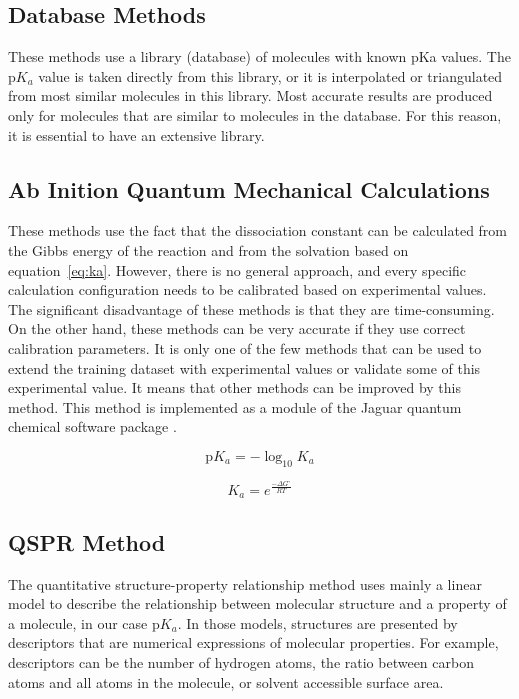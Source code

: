 \subsection{Database Methods}

These methods \cite{Sayle, Blower2006} use a library (database) of molecules
with known pKa values. The p$K_a$ value is taken directly from this library, or 
it is interpolated or triangulated from most similar molecules in this library.
Most accurate results are produced only for molecules that are similar to
molecules in the database. For this reason, it is essential to have
an extensive library.

\subsection{Ab Inition Quantum Mechanical Calculations}

These methods \cite{Liptak2002, Toth2001} use the fact that the dissociation 
constant can be calculated from the Gibbs energy of the reaction and from the
solvation based on equation~\ref{eq:ka}. However, there is no general approach,
and every specific calculation configuration needs to be calibrated based on
experimental values. The significant disadvantage of these methods is that they
are time-consuming. On the other hand, these methods can be very accurate if
they use correct calibration parameters. It is only one of the few methods that
can be used to extend the training dataset with experimental values or validate
some of this experimental value. It means that other methods can be improved
by this method. This method is implemented as a module of the Jaguar quantum
chemical software package \cite{jaguar}.

\begin{equation}
    \mathrm{p}K_a = - \log_{10} K_a
\end{equation}

\begin{equation} \label{eq:ka}
    K_a = e^{\frac{-\Delta G^\circ}{RT}}
\end{equation}

\subsection{QSPR Method}

The quantitative structure-property relationship method \cite{Dixon1993,
Zhang2006, Jelfs2007} uses mainly
a linear model to describe the relationship between molecular structure and
a property of a molecule, in our case p$K_a$. In those models, structures are
presented by descriptors \cite{Todoschini2009} that are numerical expressions of molecular
properties. For example, descriptors can be the number of hydrogen atoms, the 
ratio between carbon atoms and all atoms in the molecule, or solvent accessible
surface area.

